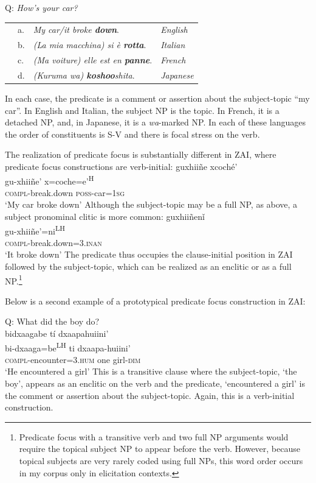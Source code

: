 \ea\label{PF}Q: \textit{How's your car?}
\begin{table} 
\begin{tabular}{l l l l}
 & a. & \textit{My car/it broke \textbf{down}}. & \textit{English} \\
 & b. & \textit{(La mia macchina) si \`{e} \textbf{rotta}}. & \textit{Italian} \\
 & c. & \textit{(Ma voiture) elle est en \textbf{panne}}. & \textit{French} \\
  & d. & \textit{(Kuruma wa) \textbf{koshoo}shita}. & \textit{Japanese} \\
\end{tabular}
\end{table}
\z

In each case, the predicate is a comment or assertion about the subject-topic ``my car''. In English and Italian, the subject NP is the topic. In French, it is a detached NP, and, in Japanese, it is a \textit{wa}-marked NP. In each of these languages the order of constituents is S-V and there is focal stress on the verb. 

The realization of predicate focus is substantially different in ZAI, where predicate focus constructions are verb-initial: 
\ea\label{predfoc1}
\glll guxhii\~{n}e xcoch\'{e}'  \\
gu-xhii\~{n}e' x=coche=e'\textsuperscript{H}  \\
\textsc{compl}-break.down \textsc{poss}-car=\textsc{1sg}  \\
\glt `My car broke down'
\z
Although the subject-topic may be a full NP, as above, a subject pronominal clitic is more common:
\ea\label{predfoc2}
\glll guxhii\~{n}en\v{i} \\
gu-xhii\~{n}e'=ni\textsuperscript{LH}  \\
\textsc{compl}-break.down=\textsc{3.inan} \\
\glt `It broke down'
\z
The predicate thus occupies the clause-initial position in ZAI followed by the subject-topic, which can be realized as an enclitic or as a full NP.\footnote{Predicate focus with a transitive verb and two full NP arguments would require the topical subject NP to appear before the verb. However, because topical subjects are very rarely coded using full NPs, this word order occurs in my corpus only in elicitation contexts.}

Below is a second example of a prototypical predicate focus construction in ZAI:

\ea\label{predfocus}
{Q: What did the boy do?} \\
\glll bidxaagabe t\'{i} dxaapahuiini' \\
bi-dxaaga=be\textsuperscript{LH} ti dxaapa-huiini' \\
\textsc{compl}-encounter=\textsc{3.hum} one girl-\textsc{dim} \\
\glt `He encountered a girl' 
\z
This is a transitive clause where the subject-topic, `the boy', appears as an enclitic on the verb and the predicate, `encountered a girl' is the comment or assertion about the subject-topic. Again, this is a verb-initial construction.

